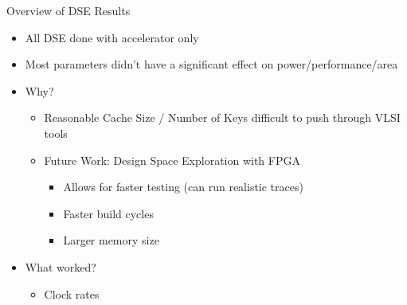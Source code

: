 \documentclass{beamer}
\begin{document}
\begin{frame}{Overview of DSE Results}
    \begin{itemize}
        \item All DSE done with accelerator only
        \item Most parameters didn't have a significant effect on power/performance/area
        \item Why?
            \begin{itemize}
                \item Reasonable Cache Size / Number of Keys difficult to push through VLSI tools
                \item Future Work: Design Space Exploration with FPGA
                    \begin{itemize}
                        \item Allows for faster testing (can run realistic traces)
                        \item Faster build cycles
                        \item Larger memory size
                    \end{itemize}
            \end{itemize}
        \item What worked?
            \begin{itemize}
                \item Clock rates
            \end{itemize}
    \end{itemize}
\end{frame}
\end{document}
